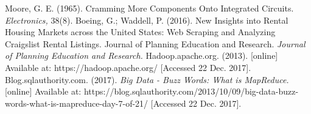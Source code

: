 \documentclass[a4paper, 12pt]{article}
\begin{document}
\cleardoublepage
{}
\begin{thebibliography}{1}
Moore, G. E. (1965). Cramming More Components Onto Integrated Circuits. \textit{Electronics,} 38(8).
Boeing, G.; Waddell, P. (2016). New Insights into Rental Housing Markets across the United States: Web Scraping and Analyzing Craigslist Rental Listings. Journal of Planning Education and Research. \textit{Journal of Planning Education and Research.}
Hadoop.apache.org. (2013). [online] Available at: https://hadoop.apache.org/ [Accessed 22 Dec. 2017]. 
Blog.sqlauthority.com. (2017). \textit{Big Data - Buzz Words: What is MapReduce.} [online] Available at: https://blog.sqlauthority.com/2013/10/09/big-data-buzz-words-what-is-mapreduce-day-7-of-21/ [Accessed 22 Dec. 2017].

\end{thebibliography}
\end{document}

